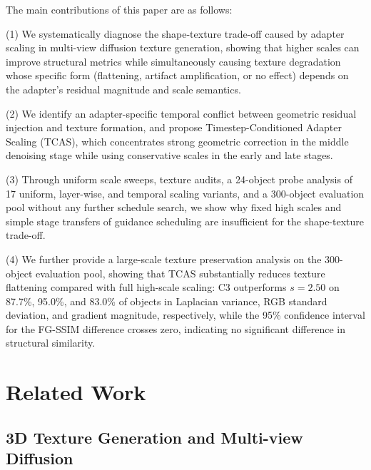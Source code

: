 \documentclass[times,twocolumn,final]{elsarticle}
\providecommand{\DIFadd}[1]{{\protect\color{blue} \sf #1}} %
\providecommand{\DIFaddbegin}{} %
\providecommand{\DIFaddend}{} %
\newcommand{\DIFaddincludegraphics}[2][]{{\color{blue}\fbox{\DIFOincludegraphics[#1]{#2}}}} %
\DeclareRobustCommand{\DIFaddbegin}{\DIFOaddbegin \let\includegraphics\DIFaddincludegraphics} %
\DeclareRobustCommand{\DIFaddend}{\DIFOaddend \let\includegraphics\DIFOincludegraphics} %
\begin{document}
The main contributions of this paper are as follows:

(1) We systematically diagnose the shape-texture trade-off caused by adapter scaling in multi-view diffusion texture generation, showing that higher scales can improve structural metrics while simultaneously causing texture degradation whose specific form (flattening, artifact amplification, or no effect) depends on the adapter's residual magnitude and scale semantics.

(2) We identify an adapter-specific temporal conflict between geometric residual injection and texture formation, and propose Timestep-Conditioned Adapter Scaling (TCAS), which concentrates strong geometric correction in the middle denoising stage while using conservative scales in the early and late stages.

(3) Through uniform scale sweeps, texture audits, a 24-object probe analysis of 17 uniform, layer-wise, and temporal scaling variants, and a 300-object   \DIFaddbegin \DIFadd{evaluation pool without any further schedule search}\DIFaddend , we show why fixed high scales and simple stage transfers of guidance scheduling are insufficient for the shape-texture trade-off.

(4) We further provide a large-scale texture preservation analysis on the 300-object   \DIFaddbegin \DIFadd{evaluation pool}\DIFaddend , showing that TCAS substantially reduces texture flattening compared with full high-scale scaling: C3 outperforms $s = 2.50$ on 87.7\%, 95.0\%, and 83.0\% of objects in Laplacian variance, RGB standard deviation, and gradient magnitude, respectively, while the 95\% confidence interval for the FG-SSIM difference crosses zero, indicating no significant difference in structural similarity.

\section{Related Work}
\label{sec:related}

\subsection{3D Texture Generation and Multi-view Diffusion}
\label{subsec:3dtex}
\end{document}
